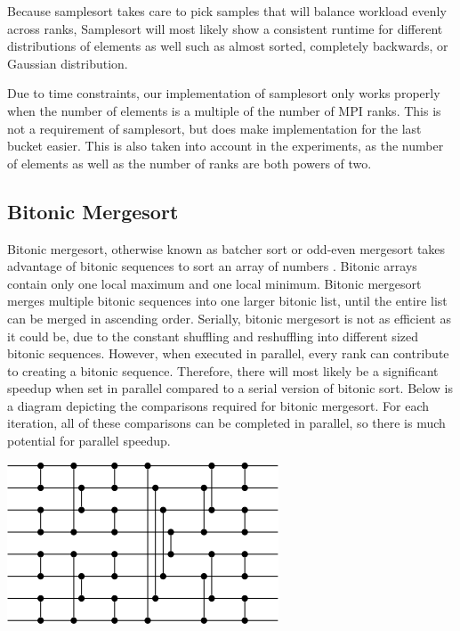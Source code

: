 \documentclass[10pt,letterpaper]{article}
\begin{document}
\begin{multicols}{2}
Because samplesort takes care to pick samples that will balance workload evenly across ranks, Samplesort will most likely show a consistent runtime for different distributions of elements as well such as almost sorted, completely backwards, or Gaussian distribution.

Due to time constraints, our implementation of samplesort only works properly when the number of elements is a multiple of the number of MPI ranks. This is not a requirement of samplesort, but does make implementation for the last bucket easier. This is also taken into account in the experiments, as the number of elements as well as the number of ranks are both powers of two.
\subsection{Bitonic Mergesort}
Bitonic mergesort, otherwise known as batcher sort or odd-even mergesort takes advantage of bitonic sequences to sort an array of numbers \cite{Knuth:1998:ACP:280635}. Bitonic arrays contain only one local maximum and one local minimum. Bitonic mergesort merges multiple bitonic sequences into one larger bitonic list, until the entire list can be merged in ascending order. Serially, bitonic mergesort is not as efficient as it could be, due to the constant shuffling and reshuffling into different sized bitonic sequences. However, when executed in parallel, every rank can contribute to creating a bitonic sequence. Therefore, there will most likely be a significant speedup when set in parallel compared to a serial version of bitonic sort. Below is a diagram depicting the comparisons required for bitonic mergesort. For each iteration, all of these comparisons can be completed in parallel, so there is much potential for parallel speedup.

\begin{center}
\includegraphics[scale=0.7]{bitonic_diagram}
\end{center}


\end{multicols}
\end{document}
